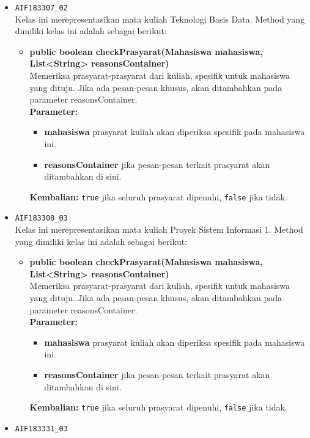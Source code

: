 \begin{enumerate}
\begin{itemize}
\begin{itemize}
		\end{itemize}
		\item \texttt{AIF183307\_02} \\
		Kelas ini merepresentasikan mata kuliah Teknologi Basis Data. Method yang dimiliki kelas ini adalah sebagai berikut: 
		\begin{itemize}
			\item \textbf{public boolean checkPrasyarat(Mahasiswa mahasiswa, List<String> reasonsContainer)}\\
			Memeriksa prasyarat-prasyarat dari kuliah, spesifik untuk mahasiswa yang dituju. Jika ada pesan-pesan khusus, akan ditambahkan pada parameter reasonsContainer.\\
			\textbf{Parameter:}
			\begin{itemize}
				\item \textbf{mahasiswa} prasyarat kuliah akan diperiksa spesifik pada mahasiswa ini.
				\item \textbf{reasonsContainer} jika pesan-pesan terkait prasyarat akan ditambahkan di sini.
			\end{itemize}
			\textbf{Kembalian:} \texttt{true} jika seluruh prasyarat dipenuhi, \texttt{false} jika tidak.
		\end{itemize}
		\item \texttt{AIF183308\_03} \\
		Kelas ini merepresentasikan mata kuliah Proyek Sistem Informasi 1. Method yang dimiliki kelas ini adalah sebagai berikut: 
		\begin{itemize}
			\item \textbf{public boolean checkPrasyarat(Mahasiswa mahasiswa, List<String> reasonsContainer)}\\
			Memeriksa prasyarat-prasyarat dari kuliah, spesifik untuk mahasiswa yang dituju. Jika ada pesan-pesan khusus, akan ditambahkan pada parameter reasonsContainer.\\
			\textbf{Parameter:}
			\begin{itemize}
				\item \textbf{mahasiswa} prasyarat kuliah akan diperiksa spesifik pada mahasiswa ini.
				\item \textbf{reasonsContainer} jika pesan-pesan terkait prasyarat akan ditambahkan di sini.
			\end{itemize}
			\textbf{Kembalian:} \texttt{true} jika seluruh prasyarat dipenuhi, \texttt{false} jika tidak.
		\end{itemize}
		\item \texttt{AIF183331\_03} \\

\end{itemize}
\end{enumerate}
